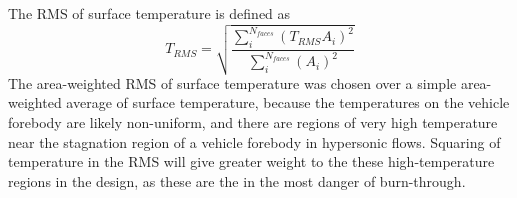 The RMS of surface temperature is defined as
\begin{equation}
  T_{RMS} =
  \sqrt{
    \frac{\sum_{i}^{N_{faces}}\left( T_{RMS} A_i \right)^2}
       {\sum_{i}^{N_{faces}}\left( A_i \right)^2}
     }
  \label{tt-rms-def}
\end{equation}
The area-weighted RMS of surface temperature was chosen over a simple
area-weighted average of surface temperature, because the temperatures on the
vehicle forebody are likely non-uniform, and there are regions of very high
temperature near the stagnation region of a vehicle forebody in hypersonic
flows.  Squaring of temperature in the RMS will give greater weight to the
these high-temperature regions in the design, as these are the in the most
danger of burn-through.
